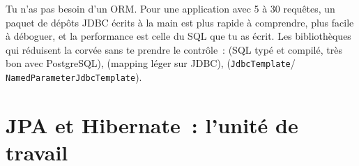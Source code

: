 \begin{astuce}
Tu n'as pas besoin d'un ORM. Pour une application avec 5 \`a 30 requ\^etes, un paquet de d\'ep\^ots JDBC
\'ecrits \`a la main est plus rapide \`a comprendre, plus facile \`a d\'eboguer, et la performance est celle
du SQL que tu as \'ecrit. Les biblioth\`eques qui r\'eduisent la corv\'ee sans te prendre le contr\^ole~:
 (SQL typ\'e et compil\'e, tr\`es bon avec PostgreSQL),
 (mapping l\'eger sur JDBC), 
(\verb|JdbcTemplate|/ \verb|NamedParameterJdbcTemplate|).
\end{astuce}

\section{JPA et Hibernate~: l'unit\'e de travail}


